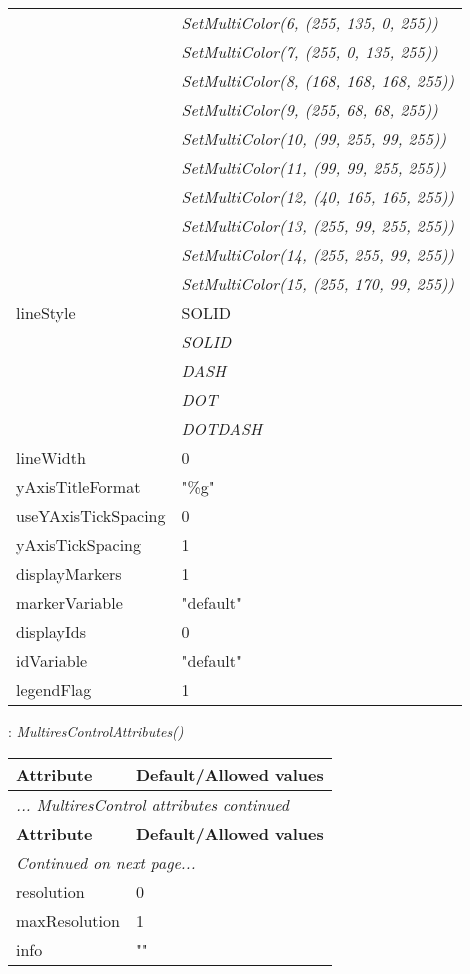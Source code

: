 \documentclass[10pt,a4paper]{report}
\begin{document}
\begin{longtable}{lp{7.5cm}}
 & {\it  SetMultiColor(6, (255, 135, 0, 255))} \\
 & {\it  SetMultiColor(7, (255, 0, 135, 255))} \\
 & {\it  SetMultiColor(8, (168, 168, 168, 255))} \\
 & {\it  SetMultiColor(9, (255, 68, 68, 255))} \\
 & {\it  SetMultiColor(10, (99, 255, 99, 255))} \\
 & {\it  SetMultiColor(11, (99, 99, 255, 255))} \\
 & {\it  SetMultiColor(12, (40, 165, 165, 255))} \\
 & {\it  SetMultiColor(13, (255, 99, 255, 255))} \\
 & {\it  SetMultiColor(14, (255, 255, 99, 255))} \\
 & {\it  SetMultiColor(15, (255, 170, 99, 255))} \\
lineStyle  &  SOLID   \\
 & {\it  SOLID} \\
 & {\it  DASH} \\
 & {\it  DOT} \\
 & {\it  DOTDASH} \\
lineWidth  &  0 \\
yAxisTitleFormat  &  "\%g" \\
useYAxisTickSpacing  &  0 \\
yAxisTickSpacing  &  1 \\
displayMarkers  &  1 \\
markerVariable  &  "default" \\
displayIds  &  0 \\
idVariable  &  "default" \\
legendFlag  &  1 \\
\end{longtable}

\newpage

{}
: {\it MultiresControlAttributes() }\\[-3mm]

\begin{longtable}{ll}
{\bf Attribute} & {\bf Default/Allowed values} \\
\hline \hline
\endfirsthead
\multicolumn{2}{l}{{\it ... MultiresControl attributes continued}} \\
{\bf Attribute} & {\bf Default/Allowed values} \\
\hline \hline
\endhead
\hline
\multicolumn{2}{l}{{\it Continued on next page...}} \\
\endfoot
\hline
\endlastfoot

resolution  &  0 \\
maxResolution  &  1 \\
info  &  "" \\
\end{longtable}
\end{document}
